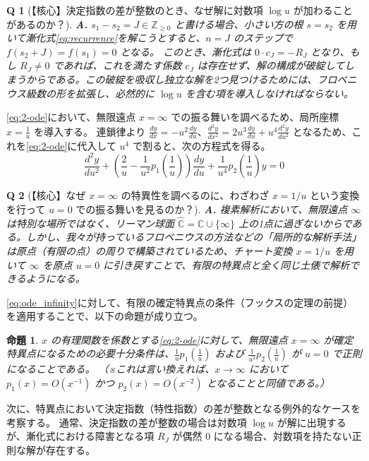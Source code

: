 \documentclass[paper=a4, fontsize=11pt]{jlreq} %
\theoremstyle{break}
\newtheorem{proposition}[theorem]{命題}
\theoremstyle{qa}
\newtheorem*{Q}{Q}
\theoremstyle{remark} %
\begin{document}
\begin{Q}[【核心】決定指数の差が整数のとき、なぜ解に対数項 $\log u$ が加わることがあるのか？]
\textbf{A.} $s_{1} - s_{2} = J \in \mathbb{Z}_{\ge 0}$ と書ける場合、小さい方の根 $s=s_{2}$ を用いて漸化式\eqref{eq:recurrence}を解こうとすると、$n=J$ のステップで $f(s_2+J) = f(s_1) = 0$ となる。
このとき、漸化式は $0 \cdot c_{J} = -R_J$ となり、もし $R_J \neq 0$ であれば、これを満たす係数 $c_{J}$ は存在せず、解の構成が破綻してしまうからである。この破綻を吸収し独立な解を2つ見つけるためには、フロベニウス級数の形を拡張し、必然的に $\log u$ を含む項を導入しなければならない。
\end{Q}
\eqref{eq:2-ode}において、無限遠点 $x=\infty$ での振る舞いを調べるため、局所座標 $x = \frac{1}{u}$ を導入する。
連鎖律より $\frac{dy}{dx} = -u^{2}\frac{dy}{du}$、$\frac{d^{2}y}{dx^{2}} = 2u^{3}\frac{dy}{du} + u^{4}\frac{d^{2}y}{du^{2}}$ となるため、これを\eqref{eq:2-ode}に代入して $u^{4}$ で割ると、次の方程式を得る。
\begin{equation}\label{eq:ode_infinity}
\frac{d^{2}y}{du^{2}} + \left(\frac{2}{u} - \frac{1}{u^{2}}p_{1}\left(\frac{1}{u}\right)\right)\frac{dy}{du} + \frac{1}{u^{4}}p_{2}\left(\frac{1}{u}\right)y = 0
\end{equation}

\begin{Q}[【核心】なぜ $x=\infty$ の特異性を調べるのに、わざわざ $x=1/u$ という変換を行って $u=0$ での振る舞いを見るのか？]
\textbf{A.} 複素解析において、無限遠点 $\infty$ は特別な場所ではなく、リーマン球面 $\hat{\mathbb{C}} = \mathbb{C} \cup \{\infty\}$ 上の1点に過ぎないからである。しかし、我々が持っているフロベニウスの方法などの「局所的な解析手法」は原点（有限の点）の周りで構築されているため、チャート変換 $x=1/u$ を用いて $\infty$ を原点 $u=0$ に引き戻すことで、有限の特異点と全く同じ土俵で解析できるようになる。
\end{Q}

\eqref{eq:ode_infinity}に対して、有限の確定特異点の条件（フックスの定理の前提）を適用することで、以下の命題が成り立つ。

\begin{proposition}\label{prop:regular_infinity}
$x$ の有理関数を係数とする\eqref{eq:2-ode}に対して、無限遠点 $x=\infty$ が確定特異点になるための必要十分条件は、$\frac{1}{u}p_{1}\left(\frac{1}{u}\right)$ および $\frac{1}{u^{2}}p_{2}\left(\frac{1}{u}\right)$ が $u=0$ で正則になることである。
（※これは言い換えれば、$x \to \infty$ において $p_{1}(x) = O(x^{-1})$ かつ $p_{2}(x) = O(x^{-2})$ となることと同値である。）
\end{proposition}
次に、特異点において決定指数（特性指数）の差が整数となる例外的なケースを考察する。
通常、決定指数の差が整数の場合は対数項 $\log u$ が解に出現するが、漸化式における障害となる項 $R_J$ が偶然 $0$ になる場合、対数項を持たない正則な解が存在する。
\end{document}
